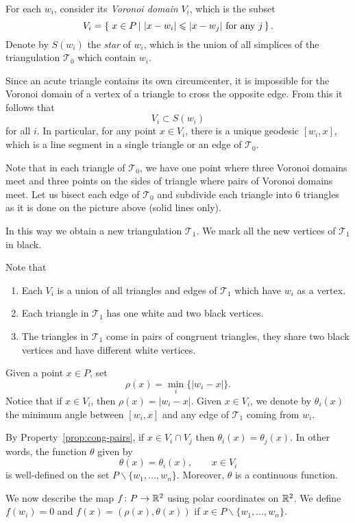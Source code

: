 For each $w_i$, consider its \emph{Voronoi domain} $V_i$,
which is the subset
$$V_i=\set{x\in P}{|x-w_i|\le|x-w_j|\ \text{for any}\ j}.$$
Denote by $S(w_i)$ the \emph{star} of $w_i$,
which is the union of all simplices of the triangulation $\mathcal{T}_0$ which contain $w_i$.


Since an acute triangle contains its own circumcenter, it is impossible for the Voronoi domain of a vertex of a triangle to cross the opposite edge.  From this it follows that
$$V_i\subset S(w_i)$$ for all $i$.
In particular, for any point $x\in V_i$, there is a unique geodesic $[w_i,x]$,
which is a line segment in a single triangle or an edge of $\mathcal{T}_0$.

Note that in each triangle of $\mathcal{T}_0$, we have one point where three Voronoi domains meet and three points on the sides of triangle where pairs of Voronoi domains meet.
Let us bisect each edge of $\mathcal{T}_0$
and subdivide each triangle into $6$ triangles as it is done on the picture above (solid lines only).

In this way we obtain a new triangulation $\mathcal{T}_1$. 
We mark all the new vertices of $\mathcal{T}_1$ in black.

Note that 
\begin{enumerate}
\item Each $V_i$ is a union of all triangles and edges of $\mathcal{T}_1$ which have $w_i$ as a vertex.
\item Each triangle in $\mathcal{T}_1$ has one white and two black vertices.
\item\label{prop:cong-pairs} The triangles in $\mathcal{T}_1$ come in pairs of congruent triangles, they share two black vertices and have different white vertices.
\end{enumerate}

Given a point $x\in P$,
set
$$\rho(x)=\min_i\{|w_i-x|\}.$$
Notice that if $x \in V_i$, then $\rho(x) = |w_i - x|$.
Given $x\in V_i$, 
we denote by $\theta_i(x)$ the minimum angle between $[w_i,x]$ and any edge of $\mathcal{T}_1$ coming from $w_i$.

By Property~\ref{prop:cong-pairs}, 
if $x\in V_i\cap V_j$ then $\theta_i(x)=\theta_j(x)$.
In other words, the function $\theta$ given by
$$\theta(x) = \theta_i(x), \qquad x \in V_i$$ is well-defined on the set $P\backslash\{w_1,\dots,w_n\}$.
Moreover, $\theta$ is a continuous function.

We now describe the map $f\colon P\to\mathbb{R}^2$ using polar coordinates on $\mathbb{R}^2$.  We define
$f(w_i)=0$ and 
$f(x)=(\rho(x),\theta(x))$ if $x \in P\backslash\{w_1,\dots,w_n\}$.

